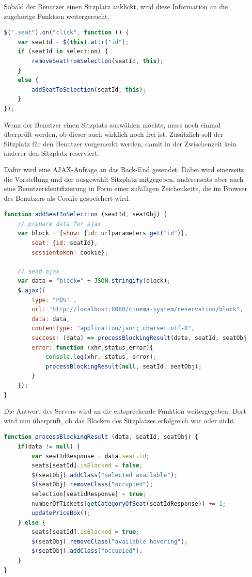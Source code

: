 Sobald der Benutzer einen Sitzplatz anklickt, wird diese Information an die zugehörige Funktion weitergereicht.

\begin{lstlisting}[language=JavaScript, caption={Erkennen des Anklickens eines Sitzplatzes}, label={lst:js_onclick}]
$(".seat").on("click", function () {
	var seatId = $(this).attr("id");
	if (seatId in selection) {
		removeSeatFromSelection(seatId, this);
	}
	else {
		addSeatToSelection(seatId, this);
	}
});
\end{lstlisting}

Wenn der Benutzer einen Sitzplatz auswählen möchte, muss noch einmal überprüft werden, ob dieser auch wirklich noch frei ist.
Zusätzlich soll der Sitzplatz für den Benutzer vorgemerkt werden, damit in der Zwischenzeit kein anderer den Sitzplatz reserviert.

Dafür wird eine \acs{AJAX}-Anfrage an das Back-End gesendet.
Dabei wird einerseits die Vorstellung und der ausgewählt Sitzplatz mitgegeben, andererseits aber auch eine Benutzeridentifizierung in Form einer zufälligen Zeichenkette, die im Browser des Benutzers als Cookie gespeichert wird.

\begin{lstlisting}[language=JavaScript, caption={Senden einer Anfrage, den Sitzplatz zu blocken}, label={lst:js_ajax_send_block}]
function addSeatToSelection (seatId, seatObj) {
	// prepare data for ajax
	var block = {show: {id: urlparameters.get("id")},
		seat: {id: seatId},
		sessiontoken: cookie};

	// send ajax
	var data = "block=" + JSON.stringify(block);
	$.ajax({
		type: "POST",
		url: "http://localhost:8080/cinema-system/reservation/block",
		data: data,
		contentType: "application/json; charset=utf-8",
		success: (data) => processBlockingResult(data, seatId, seatObj),
		error: function (xhr,status,error){
			console.log(xhr, status, error);
			processBlockingResult(null, seatId, seatObj);
		}
	});
}
\end{lstlisting}

Die Antwort des Servers wird an die entsprechende Funktion weitergegeben.
Dort wird nun überprüft, ob das Blocken des Sitzplatzes erfolgreich war oder nicht.

\begin{lstlisting}[language=JavaScript, caption={Verarbeiten der Server-Antwort beim Versuch, einen Platz zu blocken}, label={lst:js_ajax_process_block}]
function processBlockingResult (data, seatId, seatObj) {
	if(data != null) {
		var seatIdResponse = data.seat.id;
		seats[seatId].isBlocked = false;
		$(seatObj).addClass("selected available");
		$(seatObj).removeClass("occupied");
		selection[seatIdResponse] = true;
		numberOfTickets[getCategoryOfSeat(seatIdResponse)] += 1;
		updatePriceBox();
	} else {
		seats[seatId].isBlocked = true;
		$(seatObj).removeClass("available hovering");
		$(seatObj).addClass("occupied");
	}
}
\end{lstlisting}

